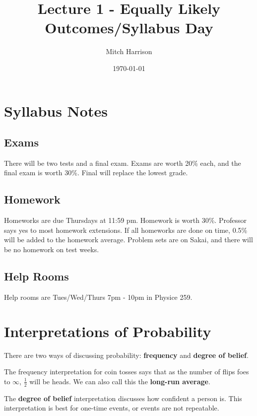 \documentclass[titlepage, 12pt, leqno]{article}
\title{\Huge{Lecture 1 - Equally Likely Outcomes/Syllabus Day}}
\author{\large{Mitch Harrison}}
\date{\today}
\begin{document}
\setlength{\parskip}{1\baselineskip}
\setlength{\parindent}{15pt}
\maketitle
\tableofcontents
\newpage


\section{Syllabus Notes}

\subsection{Exams}
There will be two tests and a final exam. Exams are worth 20\% each, and the final exam is worth 30\%. Final will replace the lowest grade.

\subsection{Homework}
Homeworks are due Thursdays at 11:59 pm. Homework is worth 30\%. Professor says yes to most homework extensions. If all homeworks are done on time, 0.5\% will be added to the homework average. Problem sets are on Sakai, and there will be no homework on test weeks.

\subsection{Help Rooms}
Help rooms are Tues/Wed/Thurs 7pm - 10pm in Physice 259.

\section{Interpretations of Probability}
There are two ways of discussing probability: \textbf{frequency} and \textbf{degree of belief}.

\begin{definition}
    The frequency interpretation for coin tosses says that as the number of flips foes to $\infty$, $\frac{1}{2} $ will be heads. We can also call this the \textbf{long-run average}.
\end{definition}

\begin{definition}
    The \textbf{degree of belief} interpretation discusses how confident a person is. This interpretation is best for one-time events, or events are not repeatable.
\end{definition}
\end{document}
